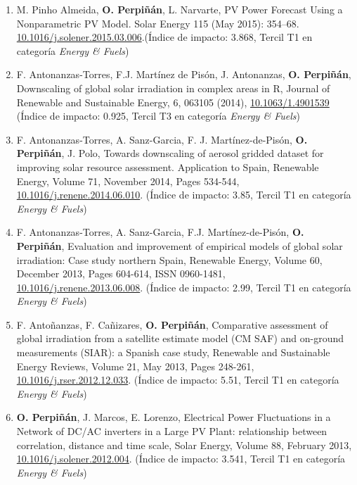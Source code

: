 \documentclass[article, a4paper]{memoir}
\begin{document}
\begin{enumerate}
\item M. Pinho Almeida, \textbf{O. Perpiñán}, L. Narvarte, PV Power Forecast
Using a Nonparametric PV Model. Solar Energy 115 (May 2015):
354–68. \href{http://dx.doi.org/10.1016/j.solener.2015.03.006}{10.1016/j.solener.2015.03.006}.(Índice de impacto: 3.868,
Tercil T1 en categoría \emph{Energy \& Fuels})

\item F. Antonanzas-Torres, F.J. Martínez de Pisón, J. Antonanzas,
\textbf{O. Perpiñán}, Downscaling of global solar irradiation in complex
areas in R, Journal of Renewable and Sustainable Energy, 6, 063105
(2014), \href{http://dx.doi.org/10.1063/1.4901539}{10.1063/1.4901539} (Índice de impacto: 0.925, Tercil T3 en
categoría \emph{Energy \& Fuels})

\item F. Antonanzas-Torres, A. Sanz-Garcia, F. J. Martínez-de-Pisón,
\textbf{O. Perpiñán}, J. Polo, Towards downscaling of aerosol gridded
dataset for improving solar resource assessment. Application to
Spain, Renewable Energy, Volume 71, November 2014, Pages 534-544,
\href{http://dx.doi.org/10.1016/j.renene.2014.06.010}{10.1016/j.renene.2014.06.010}. (Índice de impacto: 3.85, Tercil T1
en categoría \emph{Energy \& Fuels})

\item F. Antonanzas-Torres, A. Sanz-Garcia, F.J. Martínez-de-Pisón,
\textbf{O. Perpiñán}, Evaluation and improvement of empirical models of
global solar irradiation: Case study northern Spain, Renewable
Energy, Volume 60, December 2013, Pages 604-614, ISSN 0960-1481,
\href{http://dx.doi.org/10.1016/j.renene.2013.06.008}{10.1016/j.renene.2013.06.008}. (Índice de impacto: 2.99, Tercil T1
en categoría \emph{Energy \& Fuels})

\item F. Antoñanzas, F. Cañizares, \textbf{O. Perpiñán}, Comparative assessment
of global irradiation from a satellite estimate model (CM SAF) and
on-ground measurements (SIAR): a Spanish case study, Renewable and
Sustainable Energy Reviews, Volume 21, May 2013, Pages 248-261,
\href{http://dx.doi.org/10.1016/j.rser.2012.12.033}{10.1016/j.rser.2012.12.033}. (Índice de impacto: 5.51, Tercil T1 en
categoría \emph{Energy \& Fuels})

\item \textbf{O. Perpiñán}, J. Marcos, E. Lorenzo, Electrical Power
Fluctuations in a Network of DC/AC inverters in a Large PV Plant:
relationship between correlation, distance and time scale, Solar
Energy, Volume 88, February 2013,
\href{http://dx.doi.org/10.1016/j.solener.2012.12.004}{10.1016/j.solener.2012.004}. (Índice de impacto: 3.541, Tercil T1
en categoría \emph{Energy \& Fuels})


\end{enumerate}
\end{document}
